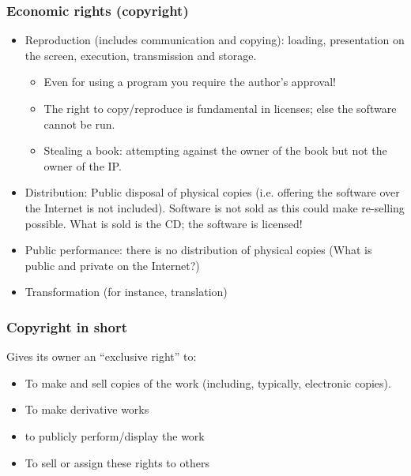 \begin{frame}
\frametitle{Economic rights (copyright)}

\begin{itemize}
\item \alert{Reproduction} (includes communication and copying): loading,
presentation on the screen, execution, transmission and storage.
\begin{itemize}
\item Even for using a program you require the author's approval!
\item The right to copy/reproduce is fundamental in licenses; else
the software cannot be run.
\item Stealing a book: attempting against the owner
of the book but not the owner of the IP. 
\end{itemize}
\item \alert{Distribution:} Public disposal of physical copies {\small(i.e. offering
the software over the Internet is not included). Software is not
sold as this could make re-selling possible. What is sold is the CD; the
software is licensed!}
\item \alert{Public performance:} there is no distribution of physical copies {\small(What is public and private on the Internet?)}
\item \alert{Transformation} {\small(for instance, translation)}
\end{itemize}


\end{frame}


\begin{frame}
\frametitle{Copyright in short}

Gives its owner an ``exclusive right'' to:

\begin{itemize}
\item To make and sell copies of the work (including,
typically, electronic copies).
\item To make derivative works
\item to publicly perform/display the work
\item To sell or assign these rights to others
\end{itemize}

\end{frame}



